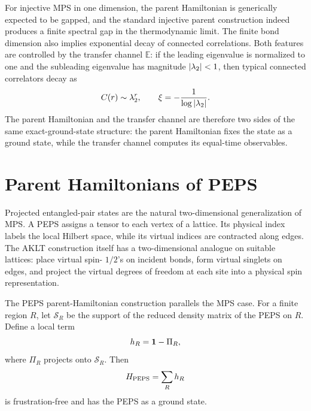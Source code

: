 For injective MPS in one dimension, the parent Hamiltonian is generically
expected to be gapped, and the standard injective parent construction indeed
produces a finite spectral gap in the thermodynamic limit.  The finite bond
dimension also implies exponential decay of connected correlations.  Both
features are controlled by the transfer channel \(\mathbb{E}\): if the leading
eigenvalue is normalized to one and the subleading eigenvalue has magnitude
\(\left|\lambda_2\right|<1\), then typical connected correlators decay as
\begin{equation}
\label{eq:mps-correlation-length-general}
    C(r)
    \sim
    \lambda_2^r,
    \qquad
    \xi=-\frac{1}{\log\left|\lambda_2\right|} .
\end{equation}
The parent Hamiltonian and the transfer channel are therefore two sides of the
same exact-ground-state structure: the parent Hamiltonian fixes the state as a
ground state, while the transfer channel computes its equal-time observables.

\section{Parent Hamiltonians of PEPS}
\label{sec:peps-parent-hamiltonians}

Projected entangled-pair states are the natural two-dimensional generalization
of MPS.  A PEPS assigns a tensor to each vertex of a lattice.  Its physical
index labels the local Hilbert space, while its virtual indices are contracted
along edges.  The AKLT construction itself has a two-dimensional analogue on
suitable lattices: place virtual spin-
\(1/2\)'s on incident bonds, form virtual singlets on edges, and project the
virtual degrees of freedom at each site into a physical spin representation.

The PEPS parent-Hamiltonian construction parallels the MPS case.  For a finite
region \(R\), let \(\mathcal{S}_R\) be the support of the reduced density matrix
of the PEPS on \(R\).  Define a local term
\begin{equation}
\label{eq:peps-parent-local-term}
    h_R=\mathbf{1}-\Pi_R,
\end{equation}
where \(\Pi_R\) projects onto \(\mathcal{S}_R\).  Then
\begin{equation}
\label{eq:peps-parent-hamiltonian}
    H_{\rm PEPS}=
    \sum_R h_R
\end{equation}
is frustration-free and has the PEPS as a ground state.

